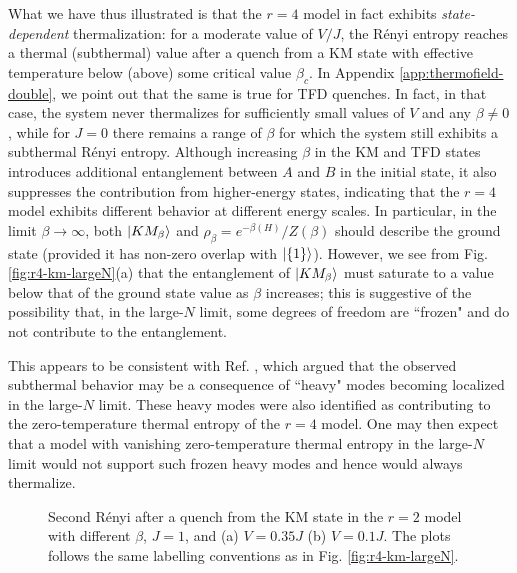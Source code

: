 \documentclass[reprint, floatfix,eqsecnum,superscriptaddress,preprint,nofootinbib,onecolumn,amsmath,amssymb,aps,prb]{revtex4-2}
\begin{document}
What we have thus illustrated is that the $r=4$ model in fact exhibits \emph{state-dependent} thermalization: for a moderate value of $V/J$, the R\'enyi entropy reaches a thermal (subthermal) value after a quench from a KM state with effective temperature below (above) some critical value $\beta_c$.
In Appendix \ref{app:thermofield-double}, we point out that the same is true for TFD quenches. In fact, in that case, the system never thermalizes for sufficiently small values of $V$ and any $\beta \neq 0$, while for $J=0$ there remains a range of $\beta$ for which the system still exhibits a subthermal R\'enyi entropy.
Although increasing $\beta$ in the KM and TFD states introduces additional entanglement between $A$ and $B$ in the initial state, it also suppresses the contribution from higher-energy states, indicating that the $r=4$ model exhibits different behavior at different energy scales. 
In particular, in the limit $\beta \to \infty$, both $\ket{KM_\beta}$ and $\rho_\beta = e^{-\beta (H)}/Z(\beta)$ should describe the ground state (provided it has non-zero overlap with $\ket{\{1\}}$). However, we see from Fig. \ref{fig:r4-km-largeN}(a) that the entanglement of $\ket{KM_\beta}$ must saturate to a value below that of the ground state value as $\beta$ increases; 
this is suggestive of the possibility that, in the large-$N$ limit, some degrees of freedom are ``frozen" and do not contribute to the entanglement. 


This appears to be consistent with Ref. \cite{Gu2017b}, which argued that the observed subthermal behavior may be a consequence of ``heavy" modes becoming localized in the large-$N$ limit. 
These heavy modes were also identified as contributing to the zero-temperature thermal entropy of the $r=4$ model. One may then expect that a model with vanishing zero-temperature thermal entropy in the large-$N$ limit would not support such frozen heavy modes and hence would always thermalize. 

\begin{figure}%
  \caption{ Second R\'enyi after a quench from the KM state in the $r=2$ model with different $\beta$, $J=1$, and (a) $V=0.35J$ (b) $V=0.1J$. The plots follows the same labelling conventions as in Fig. \ref{fig:r4-km-largeN}. 
  } \label{fig:r2-km-largeN}
\end{figure}
\end{document}
